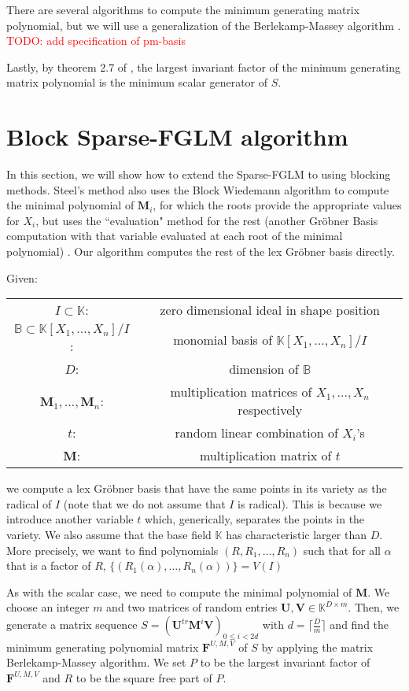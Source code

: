 \documentclass[12pt]{article}
\def\K {\ensuremath{\mathbb{K}}}
\def\K{\mathbb{K}}
\def\mF{\mathbf{F}}
\def\mM{\mathbf{M}}
\def\mU{\mathbf{U}}
\def\mV{\mathbf{V}}
\begin{document}
There are several algorithms to compute the minimum generating
matrix polynomial, but we will use a generalization
of the Berlekamp-Massey algorithm \cite{Coppersmith93}.
\textcolor{red}{TODO: add specification of pm-basis}

Lastly, by theorem 2.7 of \cite{KaYu06}, the largest 
invariant factor of the minimum generating
matrix polynomial is the minimum scalar generator
of $S$.


\newpage
\section{Block Sparse-FGLM algorithm}
In this section, we will show how to extend the Sparse-FGLM
to using blocking methods. Steel's method also uses the
Block Wiedemann algorithm to compute the minimal polynomial
of $\mM_i$, for which the roots provide the appropriate
values for $X_i$,
but uses the ``evaluation" method for the rest
(another Gr\"obner Basis computation with that variable
evaluated at each root of the minimal polynomial) \cite{Steel15}.
Our algorithm computes the rest of the lex
Gr\"obner basis directly.

Given:
\begin{center}
	\begin{tabular}{c c}
		$I \subset \mathbb{K}$:& zero dimensional ideal
		in shape position\\
		$\mathbb{B} \subset \mathbb{K}[X_1,\dots,X_n]/I$:&
		monomial basis of $\mathbb{K}[X_1,\dots,X_n]/I$\\
		$D$: & dimension of $\mathbb{B}$\\
		$\mM_1, \dots,\mM_n$:& multiplication matrices of
		$X_1 ,\dots,X_n$ respectively\\
		$t$:& random linear combination of $X_i$'s\\
		$\mM$:& multiplication matrix of $t$
	\end{tabular}
\end{center}
we compute a lex Gr\"obner basis that have the same points
in its variety as the radical of $I$ 
(note that we do not assume that $I$ is radical).
This is because we introduce another variable $t$ which,
generically, separates the points in the variety.
We also assume that the base field $\K$ has characteristic
larger than $D$. More precisely, we want to find polynomials
$(R,R_1,\dots,R_n)$ such that for all $\alpha$ that is a factor of
$R$, $\{ (R_1(\alpha),\dots,R_n(\alpha)) \} = V(I)$

As with the scalar case, we need to compute the minimal polynomial
of $\mM$. We choose an integer $m$ and two matrices of random
entries $\mU,\mV \in \K^{D\times m}$. Then, we generate a matrix
sequence $S = (\mU^{tr}\mM^i\mV)_{0 \le i < 2d}$ with
$d = \lceil \frac{D}{m} \rceil$ and find the minimum generating
polynomial matrix $\mF^{U,M,V}$ of $S$ by applying the matrix
Berlekamp-Massey algorithm. We set $P$ to be the largest
invariant factor of $\mF^{U,M,V}$ and $R$ to
be the square free part of $P$.
\end{document}
